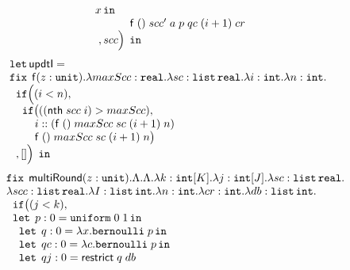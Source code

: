 \begin{figure}
\[\begin{array}{l}
                \; x \mathop{ \mathtt{in}} \\
 \hspace{1.2cm} \mathsf{f}  \; () \; scc' \; a \; p \; qc
                \; (i+1) \;  cr  \\ 
 \hspace{0.2cm} , scc  \Big ) \; \mathop{ \mathtt{in}}
\end{array}
\]
%
%
\[
\begin{array}{l}
\mathop{\mathtt{let}} \mathsf{updtI} = \\
                 \mathop{\mathtt{fix}} \;  \mathsf{f}(z : \mathtt{unit}). \lambda maxScc: \mathtt{real}. 
                 \lambda sc: \mathtt{list} \, \mathtt{real}. \lambda i: \mathtt{int}. \lambda n: \mathtt{int}. \\
 \hspace{.2cm}   \mathtt{if} \Big (   (i < n)  ,  \\
 \hspace{0.4cm}  \mathtt{if} \big( ( ( \mathsf{nth} \; scc \; i)  >  maxScc  ) ,       \\
 \hspace{0.8cm}  i :: ( \mathsf{f}  \; () \; maxScc \; sc
                 \; (i+1) \; n  )\\
 \hspace{0.8cm}  \mathsf{f}  \; () \; maxScc \; sc
                 \; (i+1) \; n  \big )  \\
 \hspace{0.2cm}  , [] \Big ) \; \mathop{ \mathtt{in}}
\end{array}
\]
%
%
\[
\begin{array}{l}
 \mathop{\mathtt{fix}} \;  \mathsf{multiRound}(z : \mathtt{unit}). \Lambda. \Lambda. 
        \lambda k: \mathtt{int}[K]. \lambda j: \mathtt{int}[J]. \lambda sc: \mathtt{list} \, \mathtt{real}.\\
        \lambda scc: \mathtt{list} \, \mathtt{real}. \lambda I: \mathtt{list} \, \mathtt{int}. \lambda n: \mathtt{int}.
        \lambda cr: \mathtt{int}. \lambda db: \mathtt{list} \, \mathtt{int}.\\
 \hspace{.2cm}  \mathtt{if}   \big (   (j < k)  ,  \\
 \hspace{.2cm}  \mathop{\mathtt{let}} \; p: 0 = \mathtt{uniform} \; 0 \; 1 \mathop{ \mathtt{in}} \\
 \hspace{0.4cm} \mathop{\mathtt{let}} \; q: 0 = \lambda x. \mathtt{bernoulli} \; p \mathop{ \mathtt{in}} \\
 \hspace{0.4cm} \mathop{\mathtt{let}} \; qc: 0 = \lambda c. \mathtt{bernoulli} \; p \mathop{ \mathtt{in}} \\
 \hspace{0.4cm} \mathop{\mathtt{let}} \; qj : 0 = \mathsf{restrict} \; q \; db\\

\end{array}\]
\end{figure}
